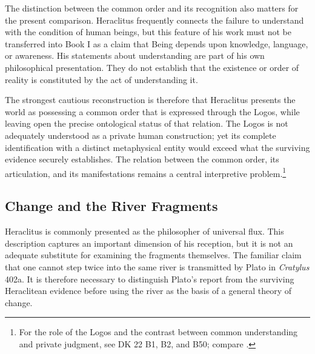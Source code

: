 The distinction between the common order and its recognition
also matters for the present comparison. Heraclitus frequently
connects the failure to understand with the condition of
human beings, but this feature of his work must not be
transferred into Book I as a claim that Being depends upon
knowledge, language, or awareness. His statements about
understanding are part of his own philosophical presentation.
They do not establish that the existence or order of reality
is constituted by the act of understanding it.

\label{para:VS.B01.P01.C08.S03.SS02.P005}

The strongest cautious reconstruction is therefore that
Heraclitus presents the world as possessing a common order
that is expressed through the Logos, while leaving open the
precise ontological status of that relation. The Logos is
not adequately understood as a private human construction;
yet its complete identification with a distinct metaphysical
entity would exceed what the surviving evidence securely
establishes. The relation between the common order, its
articulation, and its manifestations remains a central
interpretive problem.\footnote{For the role of the Logos and
the contrast between common understanding and private
judgment, see DK 22 B1, B2, and B50; compare
\cite{HeraclitusFragments,GrahamTextsEarlyGreek2010,
GrahamHeraclitusSEP2023}.}


\subsection{Change and the River Fragments}

\label{para:VS.B01.P01.C08.S03.SS03.P001}

Heraclitus is commonly presented as the philosopher of
universal flux. This description captures an important
dimension of his reception, but it is not an adequate
substitute for examining the fragments themselves. The
familiar claim that one cannot step twice into the same
river is transmitted by Plato in \textit{Cratylus} 402a.
It is therefore necessary to distinguish Plato's report
from the surviving Heraclitean evidence before using the
river as the basis of a general theory of change.

\label{para:VS.B01.P01.C08.S03.SS03.P002}

